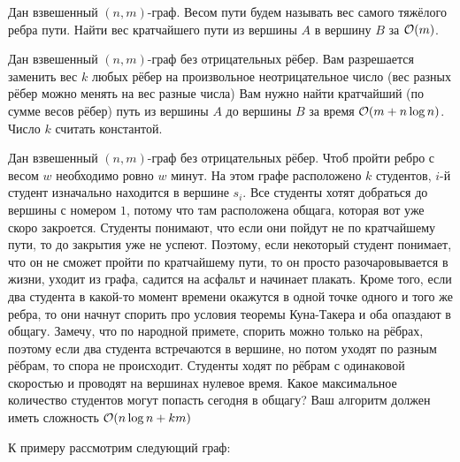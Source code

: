 \documentclass[addpoints]{exam}
\begin{document}
\begin{questions}
\question[2 \half] Дан взвешенный $(n,m)$-граф. Весом пути будем называть вес самого тяжёлого ребра пути. Найти вес кратчайшего пути из вершины $A$ в вершину $B$ за $\mathcal{O}(m)$. 

\question[1] \label{dijk} Дан взвешенный $(n,m)$-граф без отрицательных рёбер. Вам разрешается заменить вес $k$ любых рёбер на произвольное неотрицательное число (вес разных рёбер можно менять на вес разные числа) Вам нужно найти кратчайший (по сумме весов рёбер) путь из вершины $A$ до вершины $B$ за время $\mathcal{O}(m + n\log{n})$. Число $k$ считать константой. 

\question[2] Дан взвешенный $(n,m)$-граф без отрицательных рёбер. Чтоб пройти ребро с весом $w$ необходимо ровно $w$ минут. На этом графе расположено $k$ студентов, $i$-й студент изначально находится в вершине $s_i$. Все студенты хотят добраться до вершины с номером $1$, потому что там расположена общага, которая вот уже скоро закроется. Студенты понимают, что если они пойдут не по кратчайшему пути, то до закрытия уже не успеют. Поэтому, если некоторый студент понимает, что он не сможет пройти по кратчайшему пути, то он просто разочаровывается в жизни, уходит из графа, садится на асфальт и начинает плакать. Кроме того, если два студента в какой-то момент времени окажутся в одной точке одного и того же ребра, то они начнут спорить про условия теоремы Куна-Такера и оба опаздают в общагу. Замечу, что по народной примете, спорить можно только на рёбрах, поэтому если два студента встречаются в вершине, но потом уходят по разным рёбрам, то спора не происходит. Студенты ходят по рёбрам с одинаковой скоростью и проводят на вершинах нулевое время. Какое максимальное количество студентов могут попасть сегодня в общагу? Ваш алгоритм должен иметь сложность $\mathcal{O}(n \log{n} + km)$

К примеру рассмотрим следующий граф:

\begin{center}
\end{center} 


\end{questions}
\end{document}
